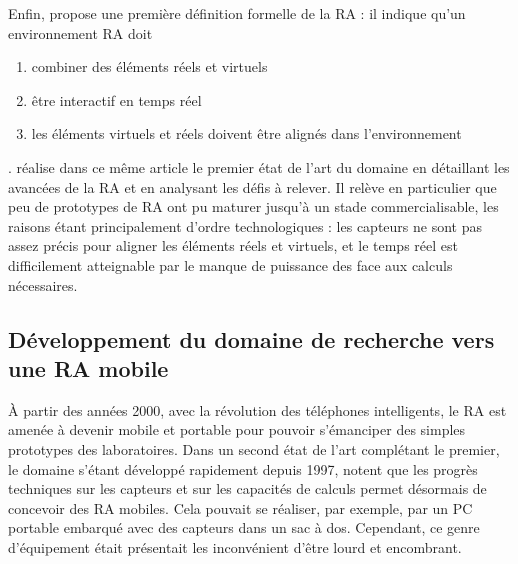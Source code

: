 Enfin, \citet{Azuma1997} propose une première définition formelle de la RA : il indique qu'un environnement RA doit 
\begin{enumerate}
  \item combiner des éléments réels et virtuels
  \item être interactif en temps réel
  \item les éléments virtuels et réels doivent être alignés dans l'environnement
\end{enumerate}.
\citeauthor{Azuma1997} réalise dans ce même article le premier état de l'art du domaine en détaillant les avancées de la RA et en analysant les défis à relever. Il relève en particulier que peu de prototypes de RA ont pu maturer jusqu'à un stade commercialisable, les raisons étant principalement d'ordre technologiques : les capteurs ne sont pas assez précis pour aligner les éléments réels et virtuels, et le temps réel est difficilement atteignable par le manque de puissance des face aux calculs nécessaires.


\subsection{Développement du domaine de recherche vers une RA mobile}
À partir des années 2000, avec la révolution des téléphones intelligents, le RA est amenée à devenir mobile et portable pour pouvoir s'émanciper des simples prototypes des laboratoires. Dans un second état de l'art complétant le premier, le domaine s'étant développé rapidement depuis 1997, \citet{AzumaBaillotBehringerEtAl2001} notent que les progrès techniques sur les capteurs et sur les capacités de calculs permet désormais de concevoir des RA mobiles. Cela pouvait se réaliser, par exemple, par un PC portable embarqué avec des capteurs dans un sac à dos. Cependant, ce genre d'équipement était présentait les inconvénient d'être lourd et encombrant. \citep{DeSaChurchill2013}

